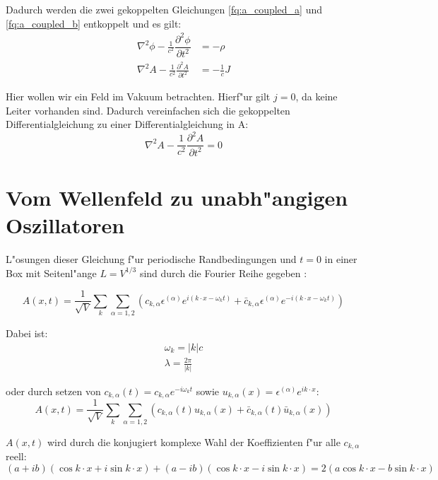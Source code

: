 Dadurch werden die zwei gekoppelten Gleichungen \ref{fq:a_coupled_a} und \ref{fq:a_coupled_b} entkoppelt und es gilt:
\begin{align}
\nabla^2 \phi - \frac{1}{c^2} \dfrac{\partial^2 \phi}{\partial t^2} &= -\rho \\
\nabla^2 A - \frac{1}{c^2} \frac{\partial^2 A }{\partial t^2} &= - \frac{1}{c} J
\end{align}

Hier wollen wir ein Feld im Vakuum betrachten. Hierf"ur gilt $j = 0$, da keine Leiter vorhanden sind.
Dadurch vereinfachen sich die gekoppelten Differentialgleichung zu einer Differentialgleichung in A:
\begin{equation} \label{fq:wave_dgl}
\nabla^2 A - \frac{1}{c^2} \frac{\partial^2 A }{\partial t^2} = 0
\end{equation}

\section{Vom Wellenfeld zu unabh"angigen Oszillatoren}
L"osungen dieser Gleichung f"ur periodische Randbedingungen und $t=0$ in einer Box mit Seitenl"ange $L = V^{1/3}$ sind durch die Fourier Reihe gegeben \cite{fq:em_wave_eq}:

\begin{equation} \label{fq:wave_eq}
A(x,t) = \frac{1}{\sqrt{V}} \sum_k \sum_{\alpha=1,2} (c_{k,\alpha} \epsilon^{(\alpha)} e^{i (k \cdot x - \omega_k t)} + \bar{c}_{k,\alpha} \epsilon^{(\alpha)} e^{-i(k \cdot x - \omega_k t)})
\end{equation}

Dabei ist:
\begin{align}
\omega_k=|k|c \\
\lambda = \frac{2 \pi}{|k|}
\end{align}

oder durch setzen von $c_{k,\alpha}(t) = c_{k,\alpha} e^{-i \omega_k t}$ sowie $u_{k,\alpha}(x) = \epsilon^{(\alpha)} e^{ik \cdot x}$:
\begin{equation}
A(x,t) = \frac{1}{\sqrt{V}} \sum_k \sum_{\alpha=1,2} (c_{k,\alpha}(t)u_{k,\alpha}(x) + \bar{c}_{k,\alpha}(t) \bar{u}_{k,\alpha}(x))
\end{equation}

$A(x,t)$ wird durch die konjugiert komplexe Wahl der Koeffizienten f"ur alle $c_{k,\alpha}$ reell:
\begin{equation}
(a + ib)(\cos k \cdot x + i \sin k \cdot x ) + (a - ib)(\cos k \cdot x - i \sin k \cdot x ) = 2 ( a \cos k \cdot x - b \sin k \cdot x )
\end{equation}

